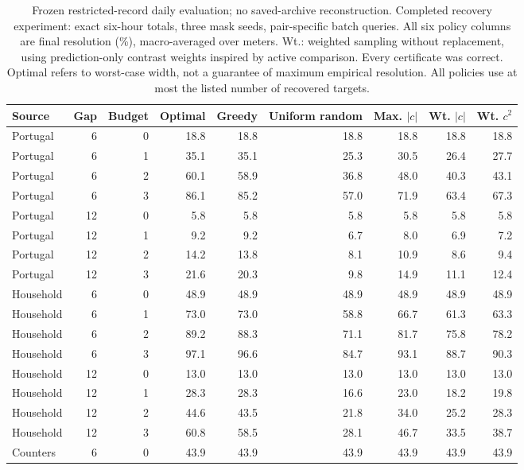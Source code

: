 \documentclass[12pt]{article}
\begin{document}
\begin{table}[htbp]
\centering\normalsize\setlength{\tabcolsep}{4pt}
\caption{Frozen restricted-record daily evaluation; no saved-archive reconstruction. Completed recovery experiment: exact six-hour totals, three mask seeds, pair-specific batch queries. All six policy columns are final resolution (\%), macro-averaged over meters. Wt.: weighted sampling without replacement, using prediction-only contrast weights inspired by active comparison. Every certificate was correct. Optimal refers to worst-case width, not a guarantee of maximum empirical resolution. All policies use at most the listed number of recovered targets.}
\label{tab:recovery}
\begin{tabular}{lrrrrrrrr}
\toprule
Source & Gap & Budget & Optimal & Greedy & Uniform random & Max. $|c|$ & Wt. $|c|$ & Wt. $c^2$\\
\midrule
Portugal & 6 & 0 & 18.8 & 18.8 & 18.8 & 18.8 & 18.8 & 18.8\\
Portugal & 6 & 1 & 35.1 & 35.1 & 25.3 & 30.5 & 26.4 & 27.7\\
Portugal & 6 & 2 & 60.1 & 58.9 & 36.8 & 48.0 & 40.3 & 43.1\\
Portugal & 6 & 3 & 86.1 & 85.2 & 57.0 & 71.9 & 63.4 & 67.3\\
Portugal & 12 & 0 & 5.8 & 5.8 & 5.8 & 5.8 & 5.8 & 5.8\\
Portugal & 12 & 1 & 9.2 & 9.2 & 6.7 & 8.0 & 6.9 & 7.2\\
Portugal & 12 & 2 & 14.2 & 13.8 & 8.1 & 10.9 & 8.6 & 9.4\\
Portugal & 12 & 3 & 21.6 & 20.3 & 9.8 & 14.9 & 11.1 & 12.4\\
Household & 6 & 0 & 48.9 & 48.9 & 48.9 & 48.9 & 48.9 & 48.9\\
Household & 6 & 1 & 73.0 & 73.0 & 58.8 & 66.7 & 61.3 & 63.3\\
Household & 6 & 2 & 89.2 & 88.3 & 71.1 & 81.7 & 75.8 & 78.2\\
Household & 6 & 3 & 97.1 & 96.6 & 84.7 & 93.1 & 88.7 & 90.3\\
Household & 12 & 0 & 13.0 & 13.0 & 13.0 & 13.0 & 13.0 & 13.0\\
Household & 12 & 1 & 28.3 & 28.3 & 16.6 & 23.0 & 18.2 & 19.8\\
Household & 12 & 2 & 44.6 & 43.5 & 21.8 & 34.0 & 25.2 & 28.3\\
Household & 12 & 3 & 60.8 & 58.5 & 28.1 & 46.7 & 33.5 & 38.7\\
Counters & 6 & 0 & 43.9 & 43.9 & 43.9 & 43.9 & 43.9 & 43.9\\

\end{tabular}
\end{table}
\end{document}
